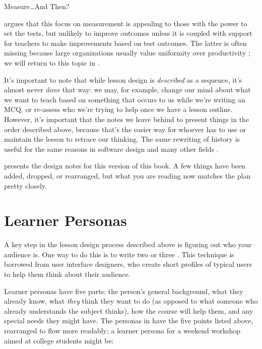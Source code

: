 \begin{callout}{Measure{\ldots}And Then?}

  \cite{Gree2014} argues that this focus on measurement is appealing
  to those with the power to set the tests, but unlikely to improve
  outcomes unless it is coupled with support for teachers to make
  improvements based on test outcomes.  The latter is often missing
  because large organizations usually value uniformity over
  productivity \cite{Scot1998}; we will return to this topic in
  .

\end{callout}

It's important to note that while lesson design is \emph{described} as
a sequence, it's almost never \emph{done} that way: we may, for
example, change our mind about what we want to teach based on
something that occurs to us while we're writing an MCQ, or re-assess
who we're trying to help once we have a lesson outline.  However, it's
important that the notes we leave behind to present things in the
order described above, because that's the easier way for whoever has
to use or maintain the lesson to retrace our thinking.  The same
rewriting of history is useful for the same reasons in software design
and many other fields \cite{Parn1986}.

 presents the design notes for this version of this book.
A few things have been added, dropped, or rearranged, but what you are
reading now matches the plan pretty closely.

\section{Learner Personas}\label{s:process-personas}

A key step in the lesson design process described above is figuring
out who your audience is.  One way to do this is to write two or three
. This technique is
borrowed from user interface designers, who create short profiles of
typical users to help them think about their audience.

Learner personas have five parts: the person's general background,
what they already know, what \emph{they} think they want to do (as
opposed to what someone who already understands the subject thinks),
how the course will help them, and any special needs they might
have. The personas in  have the five points
listed above, rearranged to flow more readably; a learner persona for
a weekend workshop aimed at college students might be:


